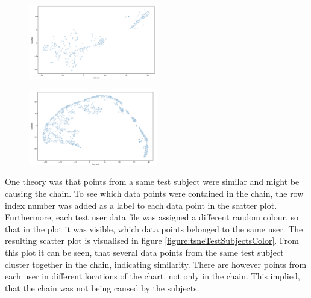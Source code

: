 \begin{figure}[h]
  \centering
  \includegraphics[width=0.5\textwidth]{./images/tsne10Files.png}
  \caption{}
  \label{figure:tsne10Files}
\end{figure}

\begin{figure}[h]
  \centering
  \includegraphics[width=0.5\textwidth]{./images/tsne10Files2Features.png}
  \caption{}
  \label{figure:tsne10Files2Features}
\end{figure}

One theory was that points from a same test subject were similar and might be causing the chain. To see which data points were contained in the chain, the row index number was added as a label to each data point in the scatter plot. Furthermore, each test user data file was assigned a different random colour, so that in the plot it was visible, which data points belonged to the same user. The resulting scatter plot is visualised in figure \ref{figure:tsneTestSubjectsColor}. From this plot it can be seen, that several data points from the same test subject cluster together in the chain, indicating similarity. There are however points from each user in different locations of the chart, not only in the chain. This implied, that the chain was not being caused by the subjects. 

